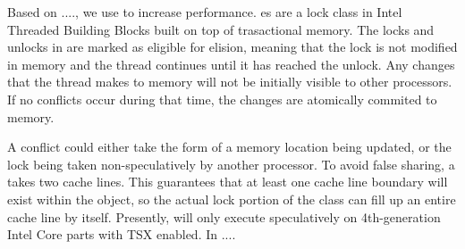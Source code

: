 
Based on ...., we use  to increase performance.
es are a lock class in Intel Threaded Building
Blocks built on top of trasactional memory. The locks and unlocks in
 are marked as eligible for elision, meaning that
the lock is not modified in memory and the thread continues until it has
reached the unlock. Any changes that the thread makes to memory will not be
initially visible to other processors. If no conflicts occur during that time, the changes are atomically commited to memory.

A conflict could either take the form of a memory location being updated, or
the lock being taken non-speculatively by another processor. To avoid false
sharing, a  takes two cache lines. This
guarantees that at least one cache line boundary will exist within the object,
so the actual lock portion of the class can fill up an entire cache line by
itself. Presently,  will only execute
speculatively on 4th-generation Intel Core parts with TSX enabled.
In ....

